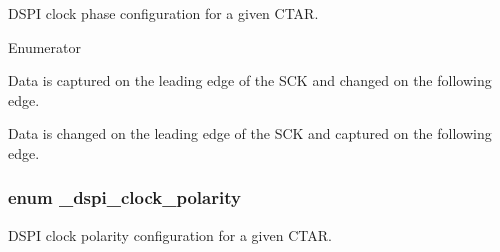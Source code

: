 D\+S\+PI clock phase configuration for a given C\+T\+AR. 

\begin{Desc}
\item[Enumerator]\par
\begin{description}
\item[{\em 
k\+Dspi\+Clock\+Phase\+\_\+\+First\+Edge\hypertarget{group__dspi__hal_gga648d70d13ec12505a80c423841f53510ada723d5970a0b0a28d96a0e707cabd9c}{}\label{group__dspi__hal_gga648d70d13ec12505a80c423841f53510ada723d5970a0b0a28d96a0e707cabd9c}
}]Data is captured on the leading edge of the S\+CK and changed on the following edge. \item[{\em 
k\+Dspi\+Clock\+Phase\+\_\+\+Second\+Edge\hypertarget{group__dspi__hal_gga648d70d13ec12505a80c423841f53510a4f1c4fe8e246d3a87f60c99d214d8921}{}\label{group__dspi__hal_gga648d70d13ec12505a80c423841f53510a4f1c4fe8e246d3a87f60c99d214d8921}
}]Data is changed on the leading edge of the S\+CK and captured on the following edge. \end{description}
\end{Desc}
\subsubsection[{\texorpdfstring{\+\_\+dspi\+\_\+clock\+\_\+polarity}{_dspi_clock_polarity}}]{\setlength{\rightskip}{0pt plus 5cm}enum {\bf \+\_\+dspi\+\_\+clock\+\_\+polarity}}\hypertarget{group__dspi__hal_ga8324f34ea4af085c11052288fc94983e}{}\label{group__dspi__hal_ga8324f34ea4af085c11052288fc94983e}


D\+S\+PI clock polarity configuration for a given C\+T\+AR. 


